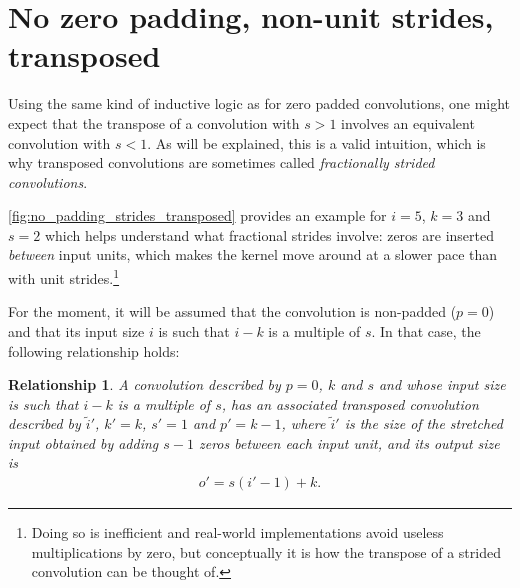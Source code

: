 \documentclass[notitlepage]{report}
\newtheorem{relationship}{Relationship}
\begin{document}
\section{No zero padding, non-unit strides, transposed}

Using the same kind of inductive logic as for zero padded convolutions, one
might expect that the transpose of a convolution with $s > 1$ involves an
equivalent convolution with $s < 1$. As will be explained, this is a valid
intuition, which is why transposed convolutions are sometimes called {\em
fractionally strided convolutions}.

\autoref{fig:no_padding_strides_transposed} provides an example for $i = 5$, $k
= 3$ and $s = 2$ which helps understand what fractional strides involve: zeros
are inserted {\em between\/} input units, which makes the kernel move around at
a slower pace than with unit strides.\footnote{Doing so is inefficient and
    real-world implementations avoid useless multiplications by zero, but
    conceptually it is how the transpose of a strided convolution can be
    thought of.}

For the moment, it will be assumed that the convolution is non-padded ($p = 0$)
and that its input size $i$ is such that $i - k$ is a multiple of $s$. In that
case, the following relationship holds:

\begin{relationship}\label{rel:no_padding_strides_transposed}
A convolution described by $p = 0$, $k$ and $s$ and whose input
size is such that $i - k$ is a multiple of $s$, has an associated transposed
convolution described by $\tilde{i}'$, $k' = k$, $s' = 1$ and $p' = k - 1$,
where $\tilde{i}'$ is the size of the stretched input obtained by adding
$s - 1$ zeros between each input unit, and its output size is
\begin{equation*}
\begin{split}
    o' = s (i' - 1) + k.
\end{split}
\end{equation*}
\end{relationship}
\end{document}
